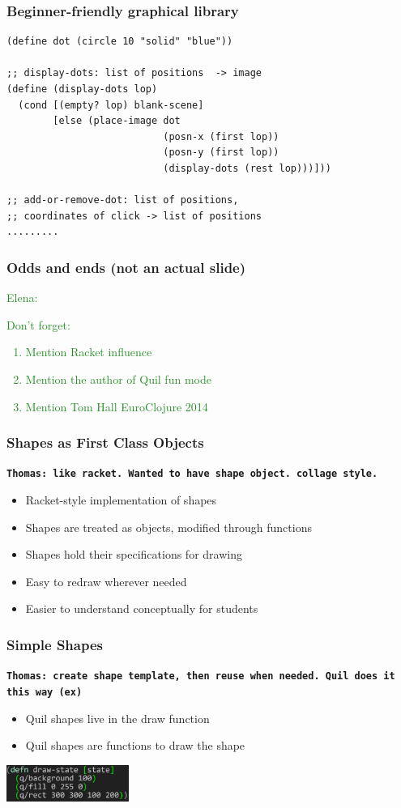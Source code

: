 \documentclass{beamer}
\newcommand{\comment}[1]{{\bf \tt  {#1}}}
\newcommand{\emcomment}[1]{\textcolor{ForestGreen}{\comment{Elena: {#1}}}}
\newcommand{\thcomment}[1]{\textcolor{BestBlue}{\comment{Thomas: {#1}}}}
\begin{document}
\begin{frame}[fragile]
\frametitle{Beginner-friendly graphical library}
\begin{verbatim}
(define dot (circle 10 "solid" "blue"))

;; display-dots: list of positions  -> image
(define (display-dots lop)     
  (cond [(empty? lop) blank-scene]
        [else (place-image dot
                           (posn-x (first lop))
                           (posn-y (first lop))
                           (display-dots (rest lop)))]))

;; add-or-remove-dot: list of positions, 
;; coordinates of click -> list of positions
.........
\end{verbatim}

\end{frame}

\begin{frame}
\frametitle{Odds and ends (not an actual slide)}
\emcomment{Don't forget:
\begin{enumerate}
\item Mention Racket influence  
\item Mention the author of Quil fun mode
\item Mention Tom Hall EuroClojure 2014
\end{enumerate}
}
\end{frame}



\begin{frame}
\frametitle{Shapes as First Class Objects}
\thcomment{like racket. Wanted to have shape object. collage style.}
	\begin{itemize}
		\item Racket-style implementation of shapes
		\item Shapes are treated as objects, modified through functions
		\item Shapes hold their specifications for drawing
		\item Easy to redraw wherever needed
		\item Easier to understand conceptually for students
	\end{itemize}
\end{frame}

\begin{frame}


\frametitle{Simple Shapes}
\thcomment{create shape template, then reuse when needed. Quil does it this way (ex)}
	\begin{itemize}
		\item Quil shapes live in the draw function
		\item Quil shapes are functions to draw the shape
	\end{itemize}
	\includegraphics[width=4cm]{PresentationImages/quilGreenRect.png}
\end{frame}
\end{document}
